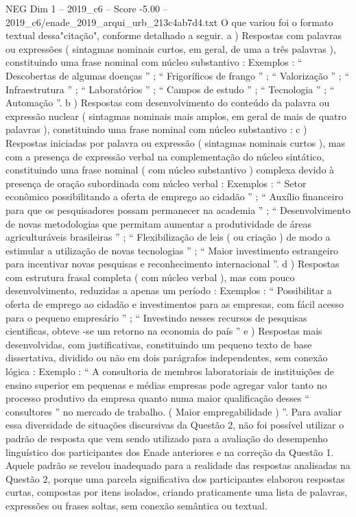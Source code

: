 \begin{textsample}{NEG Dim 1 – 2019\_c6 – Score -5.00 – 2019\_c6/enade\_2019\_arqui\_urb\_213c4ab7d4.txt}
O que variou foi o formato textual dessa"citação", conforme detalhado a seguir. a ) Respostas com palavras ou expressões ( sintagmas nominais curtos, em geral, de uma a três palavras ), constituindo uma frase nominal com núcleo substantivo : Exemplos : “ Descobertas de algumas doenças ” ; “ Frigoríficos de frango ” ; “ Valorização ” ; “ Infraestrutura ” ; “ Laboratórios ” ; “ Campos de estudo ” ; “ Tecnologia ” ; “ Automação ”. b ) Respostas com desenvolvimento do conteúdo da palavra ou expressão nuclear ( sintagmas nominais mais amplos, em geral de mais de quatro palavras ), constituindo uma frase nominal com núcleo substantivo : c ) Respostas iniciadas por palavra ou expressão ( sintagmas nominais curtos ), mas com a presença de expressão verbal na complementação do núcleo sintático, constituindo uma frase nominal ( com núcleo substantivo ) complexa devido à presença de oração subordinada com núcleo verbal : Exemplos : “ Setor econômico possibilitando a oferta de emprego ao cidadão ” ; “ Auxílio financeiro para que os pesquisadores possam permanecer na academia ” ; “ Desenvolvimento de novas metodologias que permitam aumentar a produtividade de áreas agriculturáveis brasileiras ” ; “ Flexibilização de leis ( ou criação ) de modo a estimular a utilização de novas tecnologias ” ; “ Maior investimento estrangeiro para incentivar novas pesquisas e reconhecimento internacional ”. d ) Respostas com estrutura frasal completa ( com núcleo verbal ), mas com pouco desenvolvimento, reduzidas a apenas um período : Exemplos : “ Possibilitar a oferta de emprego ao cidadão e investimentos para as empresas, com fácil acesso para o pequeno empresário ” ; “ Investindo nesses recursos de pesquisas cientificas, obteve -se um retorno na economia do país ” e ) Respostas mais desenvolvidas, com justificativas, constituindo um pequeno texto de base dissertativa, dividido ou não em dois parágrafos independentes, sem conexão lógica : Exemplo : “ A consultoria de membros laboratoriais de instituições de ensino superior em pequenas e médias empresas pode agregar valor tanto no processo produtivo da empresa quanto numa maior qualificação desses “ consultores ” no mercado de trabalho. ( Maior empregabilidade ) ”.
Para avaliar essa diversidade de situações discursivas da Questão 2, não foi possível utilizar o padrão de resposta que vem sendo utilizado para a avaliação do desempenho linguístico dos participantes dos Enade anteriores e na correção da Questão 1.
Aquele padrão se revelou inadequado para a realidade das respostas analisadas na Questão 2, porque uma parcela significativa dos participantes elaborou respostas curtas, compostas por itens isolados, criando praticamente uma lista de palavras, expressões ou frases soltas, sem conexão semântica ou textual.

\end{textsample}
